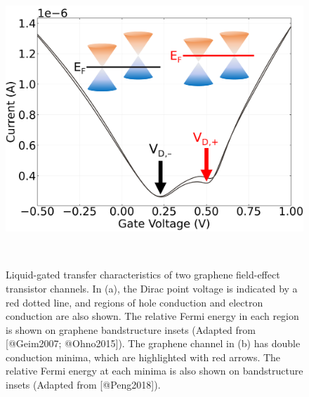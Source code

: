 \documentclass[
  letterpaper,
  DIV=11,
  numbers=noendperiod]{scrartcl}
\begin{document}
\begin{figure}
\begin{minipage}{0.01\linewidth}
~\end{minipage}%
%
\begin{minipage}{0.45\linewidth}
\includegraphics{figures/ch2/Graphene_transfer_2.png}\end{minipage}%
%
\begin{minipage}{0.01\linewidth}
~\end{minipage}%

\caption{\label{fig-graphene-characteristics}Liquid-gated transfer
characteristics of two graphene field-effect transistor channels. In
(a), the Dirac point voltage is indicated by a red dotted line, and
regions of hole conduction and electron conduction are also shown. The
relative Fermi energy in each region is shown on graphene bandstructure
insets (Adapted from {[}@Geim2007; @Ohno2015{]}). The graphene channel
in (b) has double conduction minima, which are highlighted with red
arrows. The relative Fermi energy at each minima is also shown on
bandstructure insets (Adapted from {[}@Peng2018{]}).}

\end{figure}%
\end{document}
